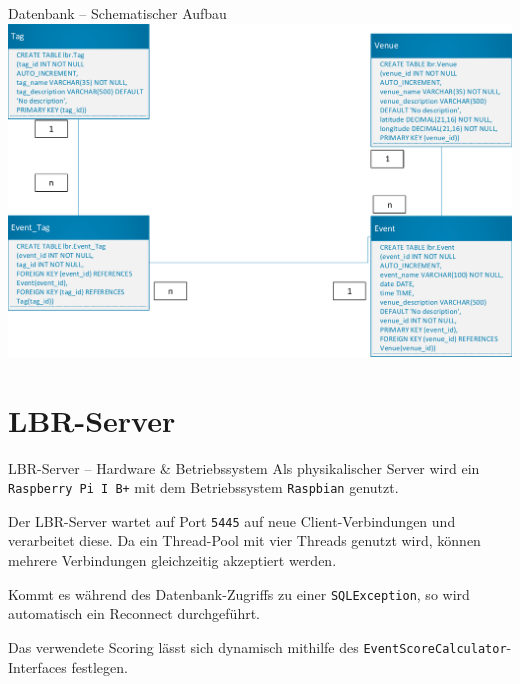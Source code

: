 \documentclass{beamer}
\begin{document}
	\begin{frame}{Datenbank -- Schematischer Aufbau}
		\centering\includegraphics[scale=0.5]{db_scheme}
	\end{frame}

	\section{LBR-Server}
	\begin{frame}{LBR-Server -- Hardware \& Betriebssystem}
		Als physikalischer Server wird ein \texttt{Raspberry Pi I B+} mit dem Betriebssystem \texttt{Raspbian} genutzt.
		
		Der LBR-Server wartet auf Port \texttt{5445} auf neue Client-Verbindungen und verarbeitet diese. Da ein \alert{Thread-Pool} mit vier Threads genutzt wird, können mehrere Verbindungen gleichzeitig akzeptiert werden.\pause
		
		Kommt es während des Datenbank-Zugriffs zu einer \texttt{SQLException}, so wird automatisch ein \alert{Reconnect} durchgeführt.
		
		Das verwendete \alert{Scoring} lässt sich dynamisch mithilfe des \texttt{EventScoreCalculator}-Interfaces festlegen.
	\end{frame}
\end{document}
